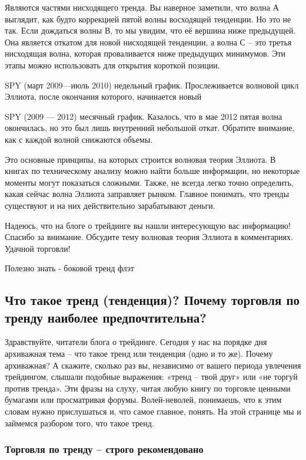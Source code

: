 \documentclass{book}
\begin{document}
Являются частями нисходящего тренда. Вы наверное заметили, что волна А выглядит, как будто коррекцией пятой волны восходящей тенденции. Но это не так. Если дождаться волны В, то мы увидим, что её вершина ниже предыдущей. Она является откатом для новой нисходящей тенденции, а волна С – это третья нисходящая волна, которая проваливается ниже предыдущих минимумов. Эти этапы можно использовать для открытия короткой позиции.

SPY (март 2009—июль 2010) недельный график. Прослеживается волновой цикл Эллиота, после окончания которого, начинается новый

SPY (2009 — 2012) месячный график. Казалось, что в мае 2012 пятая волна окончилась, но это был лишь внутренний небольшой откат. Обратите внимание, как с каждой волной снижаются объемы.

Это основные принципы, на которых строится волновая теория Эллиота. В книгах по техническому анализу можно найти больше информации, но некоторые моменты могут показаться сложными. Также, не всегда легко точно определить, какая сейчас волна Эллиота заправляет рынком. Главное понимать, что тренды существуют и на них действительно зарабатывают деньги.

Надеюсь, что на блоге о трейдинге вы нашли интересующую вас информацию! Спасибо за внимание. Обсудите тему волновая теория Эллиота в комментариях. Удачной торговли!


Полезно знать - боковой тренд флэт

\subsection{Что такое тренд (тенденция)? Почему торговля по тренду
  наиболее предпочтительна?}

Здравствуйте, читатели блога о трейдинге. Сегодня у нас на порядке дня
архиважная тема – что такое тренд или тенденция (одно и то же). Почему
архиважная? А скажите, сколько раз вы, независимо от вашего периода
увлечения трейдингом, слышали подобные выражения: «тренд – твой друг»
или «не торгуй против тренда». Эти фразы на слуху, читая любую книгу
по торговле ценными бумагами или просматривая форумы. Волей-неволей,
понимаешь, что к этим словам нужно прислушаться и, что самое главное,
понять. На этой странице мы и займемся разбором того, что такое тренд.

\subsubsection{Торговля по тренду – строго рекомендовано }
\end{document}
